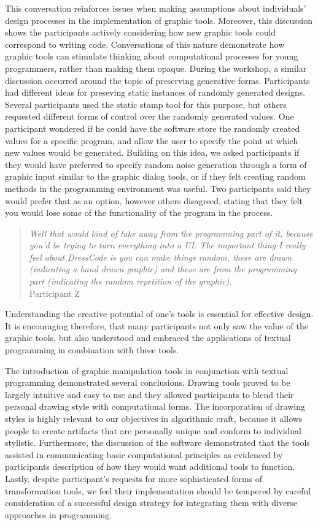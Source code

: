 \documentclass{sigchi}
\begin{document}
This conversation reinforces issues when making assumptions about individuals' design processes in the implementation of graphic tools. Moreover, this discussion shows the participants actively considering how new graphic tools could correspond to writing code. Conversations of this nature demonstrate how graphic tools can stimulate thinking about computational processes for young programmers, rather than making them opaque. During the workshop, a similar discussion occurred around the topic of preserving generative forms. Participants had different ideas for preseving static instances of randomly generated designs. Several participants used the static stamp tool for this purpose, but others requested different forms of control over the randomly generated values. One participant wondered if he could have the software store the randomly created values for a specific program, and allow the user to specify the point at which new values would be generated. Building on this idea, we asked participants if they would have preferred to specify random noise generation through a form of graphic input similar to the graphic dialog tools, or if they felt creating random methods in the programming environment was useful. Two participants said they would prefer that as an option, however others disagreed, stating that they felt you would lose some of the functionality of the program in the process.
\begin{quotation} 
\textit{Well that would kind of take away from the programming part of it, because you'd be trying to turn everything into a UI.
The important thing I really feel about DressCode is you can make things random, these are drawn (indicating a hand drawn graphic) and these are from the programming part (indicating the random repetition of the graphic).}
\\Participant Z
\end{quotation}

Understanding the creative potential of one's tools is essential for effective design. It is encouraging therefore, that many participants not only saw the value of the graphic tools, but also understood and embraced the applications of textual programming in combination with these tools.  

The introduction of graphic manipulation tools in conjunction with textual programming demonstrated several conclusions. Drawing tools proved to be largely intuitive and easy to use and they allowed participants to blend their personal drawing style with computational forms. The incorporation of drawing styles is highly relevant to our objectives in algorithmic craft, because it allows people to create artifacts that are personally unique and conform to individual stylistic. Furthermore, the discussion of the software demonstrated that the tools assisted in communicating basic computational principles as evidenced by participants description of how they would want additional tools to function. Lastly, despite participant's requests for more sophisticated forms of transformation tools, we feel their implementation should be tempered by careful consideration of a successful design strategy for integrating them with diverse approaches in programming. 
\end{document}
